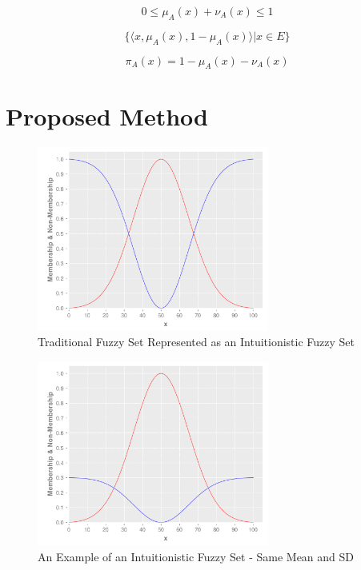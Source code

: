 \documentclass[conference]{IEEEtran}
\begin{document}
\begin{equation}
  \label{intuitionistic-interval}
  0 \leq \mu_{A}(x) + \nu_{A}(x) \leq 1
\end{equation}

\begin{equation}
  \label{ifs-form}
  \{ \langle x, \mu_{A}(x), 1 - \mu_{A}(x) \rangle | x \in E \}
\end{equation}

\begin{equation}
  \label{fs-as-ifs-if}
  \pi_{A}(x) = 1 - \mu_{A}(x) - \nu_{A}(x)
\end{equation}

\section{Proposed Method}
\label{proposed-method}

\begin{figure}[!t]
  \centering
  \includegraphics[width=3.0in]{fs-as-ifs}
  \caption{Traditional Fuzzy Set Represented as an Intuitionistic Fuzzy Set}
  \label{fs-as-ifs}
\end{figure}

\begin{figure}[!t]
  \centering
  \includegraphics[width=3.0in]{ifs}
  \caption{An Example of an Intuitionistic Fuzzy Set - Same Mean and SD}
  \label{ifs}
\end{figure}
\end{document}
